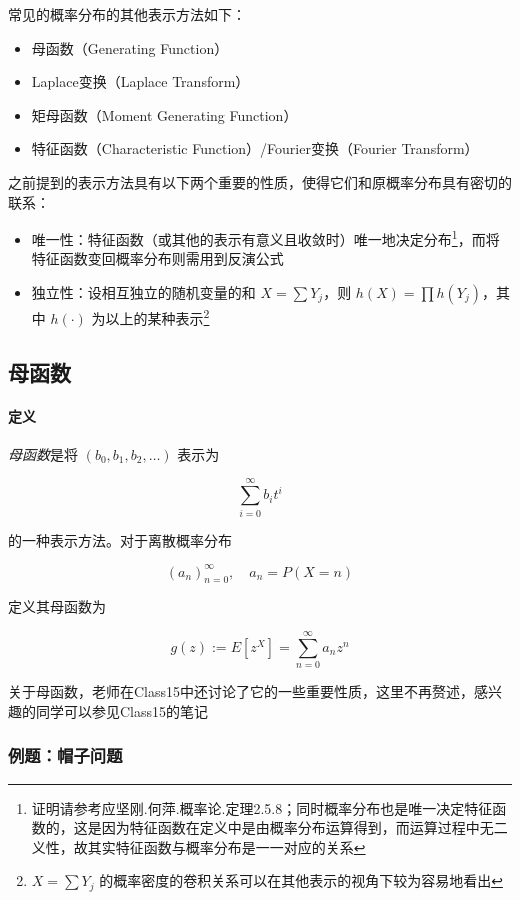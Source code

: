 \documentclass[a4paper, 11pt]{article} %
\begin{document}
常见的概率分布的其他表示方法如下：

\begin{itemize}
	\item 母函数（Generating Function）
	\item Laplace变换（Laplace Transform）
	\item 矩母函数（Moment Generating Function）
	\item 特征函数（Characteristic Function）/Fourier变换（Fourier Transform）
\end{itemize}

之前提到的表示方法具有以下两个重要的性质，使得它们和原概率分布具有密切的联系：

\begin{itemize}
	\item 唯一性：特征函数（或其他的表示有意义且收敛时）唯一地决定分布\footnote{证明请参考应坚刚.何萍.概率论.定理2.5.8；同时概率分布也是唯一决定特征函数的，这是因为特征函数在定义中是由概率分布运算得到，而运算过程中无二义性，故其实特征函数与概率分布是一一对应的关系}，而将特征函数变回概率分布则需用到反演公式
	\item 独立性：设相互独立的随机变量的和 $X=\sum Y_j$，则 $h(X)=\prod h(Y_j)$，其中 $h(\cdot)$ 为以上的某种表示\footnote{$X=\sum Y_j$ 的概率密度的卷积关系可以在其他表示的视角下较为容易地看出}
\end{itemize}

\subsection{母函数}

\paragraph{定义}

\emph{母函数}是将 $(b_0,b_1,b_2,\dots)$ 表示为 

\begin{equation*}
	\sum\limits_{i=0}^{\infty}b_it^i
\end{equation*}

的一种表示方法。对于离散概率分布

$$
(a_n)_{n=0}^\infty,\quad a_n=P(X=n)
$$

定义其母函数为

$$
g(z):=E[z^X]=\sum\limits_{n=0}^\infty a_nz^n
$$

关于母函数，老师在Class15中还讨论了它的一些重要性质，这里不再赘述，感兴趣的同学可以参见Class15的笔记

\subsubsection{例题：帽子问题}
\end{document}
